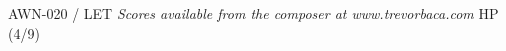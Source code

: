 \documentclass[11pt]{report}
\begin{document}
\null \vfill

AWN-020 / LET \hfill
\textit{Scores available from the composer at www.trevorbaca.com}
\hfill HP (4/9)
\end{document}
